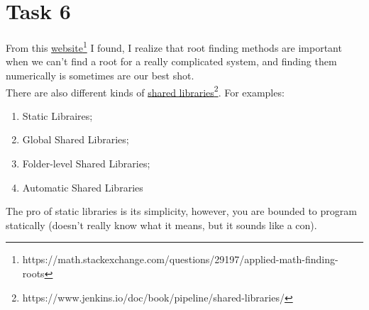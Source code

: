 \documentclass{article}
\begin{document}
\section*{Task 6}
From this \href{https://math.stackexchange.com/questions/29197/applied-math-finding-roots}{website}\footnote{https://math.stackexchange.com/questions/29197/applied-math-finding-roots} I found, I realize that root finding methods are important when we can't find a root for a really complicated system, and finding them numerically is sometimes are our best shot. \\
There are also different kinds of \href{https://www.jenkins.io/doc/book/pipeline/shared-libraries/}{shared libraries}\footnote{https://www.jenkins.io/doc/book/pipeline/shared-libraries/}. For examples:
	\begin{enumerate}
		\item Static Libraires;
		\item Global Shared Libraries;
		\item Folder-level Shared Libraries;
		\item Automatic Shared Libraries
	\end{enumerate}
The pro of static libraries is its simplicity, however, you are bounded to program statically (doesn't really know what it means, but it sounds like a con).
\end{document}
